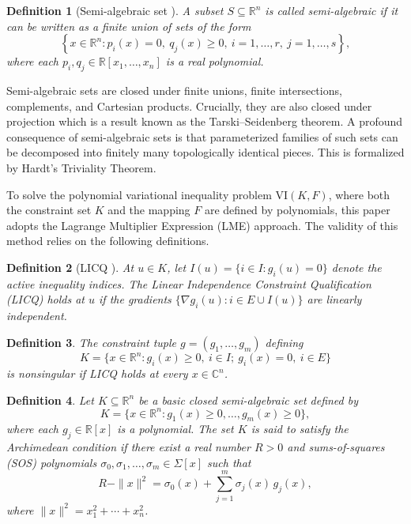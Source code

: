 \documentclass[sn-basic,Numbered]{sn-jnl}
\newcommand{\VI}{\mathrm{VI}}
\theoremstyle{thmstyleone}%
\newtheorem{definition}{Definition}%
\begin{document}
\begin{definition}[Semi-algebraic set \cite{Bochnak1998,Coste2002}]
A subset $S \subseteq \mathbb{R}^n$ is called \emph{semi-algebraic} if it can be written as a finite union of sets of the form
\[
    \left\{ x \in \mathbb{R}^n : p_i(x) = 0,\ q_j(x) 
 \geq 0,\ i=1,\dots,r,\ j=1,\dots,s \right\},
\]
where each $p_i, q_j \in \mathbb{R}[x_1,\dots,x_n]$ is a real polynomial.
\end{definition}

Semi-algebraic sets are closed under finite unions, finite intersections, complements, and Cartesian products. Crucially, they are also closed under projection which is a result known as the Tarski--Seidenberg theorem\cite{Bochnak1998}.
A profound consequence of semi-algebraic sets is that parameterized families of such sets can be decomposed into finitely many topologically identical pieces. This is formalized by Hardt's Triviality Theorem\cite{hardt1980semi}.

To solve the polynomial variational inequality problem $\VI(K, F)$, where both the constraint set $K$ and the mapping $F$ are defined by polynomials, this paper adopts the Lagrange Multiplier Expression (LME) approach. The validity of this method relies on the following definitions.

\begin{definition}[LICQ \cite{NocedalWright2006}]
At $u \in K$, let $I(u) = \{i \in I : g_i(u) = 0\}$ denote the active inequality indices. The Linear Independence Constraint Qualification (LICQ) holds at $u$ if the gradients $\{\nabla g_i(u) : i \in E \cup I(u)\}$ are linearly independent.
\end{definition}

\begin{definition}
\label{def:nonsingular}
The constraint tuple $g = (g_1,\dots,g_m)$ defining
\[
    K = \{ x \in \mathbb{R}^n : g_i(x) \geq 0,\ i \in I;\ g_i(x) = 0,\ i \in E \}
\]
is \emph{nonsingular} if LICQ holds at every $x \in \mathbb{C}^n$.
\end{definition}

\begin{definition}
Let $K \subseteq \mathbb{R}^n$ be a basic closed semi-algebraic set defined by
\[
K = \{ x \in \mathbb{R}^n : g_1(x) \geq 0, \dots, g_m(x) \geq 0 \},
\]
where each $g_j \in \mathbb{R}[x]$ is a polynomial.  
The set $K$ is said to satisfy the \emph{Archimedean condition} if there exist a real number $R > 0$ and sums-of-squares (SOS) polynomials $\sigma_0, \sigma_1, \dots, \sigma_m \in \Sigma[x]$ such that
\[
R - \|x\|^2 = \sigma_0(x) + \sum_{j=1}^m \sigma_j(x) \, g_j(x),
\]
where $\|x\|^2 = x_1^2 + \cdots + x_n^2$.
\end{definition}
\end{document}
